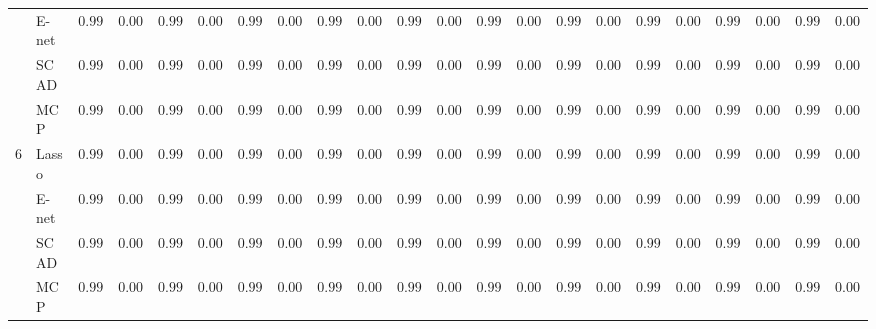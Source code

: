 \begin{tabular}{llllllllllllllllllllll}
	& E-net  & $0.9955$ & $0.0034$ & $0.9946$ & $0.0032$ & $0.9932$ & $0.0037$ & $0.9928$ & $0.0027$ & $0.9956$ & $0.0027$ & $0.9967$ & $0.0039$ & $0.9985$ & $0.0022$ & $0.9952$ & $0.0033$ & $0.9960$ & $0.0052$ & $0.9970$ & $0.0017$ \\
	& SCAD  & $0.9966$ & $0.0034$ & $0.9965$ & $0.0032$ & $0.9979$ & $0.0024$ & $0.9991$ & $0.0015$ & $0.9963$ & $0.0037$ & $0.9956$ & $0.0035$ & $0.9976$ & $0.0033$ & $0.9967$ & $0.0034$ & $0.9964$ & $0.0033$ & $0.9986$ & $0.0021$ \\
	& MCP  & $0.9991$ & $0.0013$ & $0.9991$ & $0.0012$ & $0.9997$ & $0.0006$ & $0.9997$ & $0.0005$ & $0.9990$ & $0.0012$ & $0.9990$ & $0.0013$ & $0.9994$ & $0.0010$ & $0.9991$ & $0.0012$ & $0.9993$ & $0.0010$ & $0.9995$ & $0.0009$ \\
	6 & Lasso  & $0.9966$ & $0.0031$ & $0.9955$ & $0.0031$ & $0.9942$ & $0.0036$ & $0.9959$ & $0.0023$ & $0.9965$ & $0.0029$ & $0.9972$ & $0.0033$ & $0.9990$ & $0.0018$ & $0.9960$ & $0.0030$ & $0.9955$ & $0.0051$ & $0.9988$ & $0.0012$ \\
	& E-net  & $0.9955$ & $0.0034$ & $0.9946$ & $0.0032$ & $0.9932$ & $0.0037$ & $0.9928$ & $0.0027$ & $0.9957$ & $0.0030$ & $0.9967$ & $0.0039$ & $0.9985$ & $0.0022$ & $0.9952$ & $0.0033$ & $0.9960$ & $0.0052$ & $0.9970$ & $0.0017$ \\
	& SCAD  & $0.9966$ & $0.0034$ & $0.9965$ & $0.0032$ & $0.9979$ & $0.0024$ & $0.9991$ & $0.0015$ & $0.9970$ & $0.0032$ & $0.9956$ & $0.0035$ & $0.9976$ & $0.0033$ & $0.9967$ & $0.0034$ & $0.9964$ & $0.0033$ & $0.9986$ & $0.0021$ \\
	& MCP  & $0.9991$ & $0.0013$ & $0.9991$ & $0.0012$ & $0.9997$ & $0.0006$ & $0.9997$ & $0.0005$ & $0.9991$ & $0.0012$ & $0.9990$ & $0.0013$ & $0.9994$ & $0.0010$ & $0.9991$ & $0.0012$ & $0.9993$ & $0.0010$ & $0.9995$ & $0.0009$ \\
	\hline 
\end{tabular}